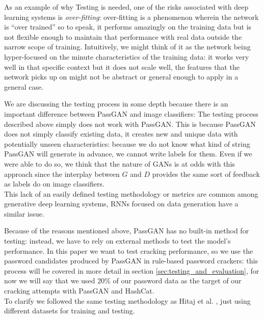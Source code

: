 As an example of why Testing is needed, one of the risks associated with deep learning systems is \emph{over-fitting}: over-fitting is a phenomenon wherein the network is \enquote{over trained} so to speak, it performs amazingly on the training data but is not flexible enough to maintain that performance with real data outside the narrow scope of training. Intuitively, we might think of it as the network being hyper-focused on the minute characteristics of the training data: it works very well in that specific context but it does not scale well, the features that the network picks up on might not be abstract or general enough to apply in a general case. 

We are discussing the testing process in some depth because there is an important difference between PassGAN and image classifiers: The testing process described above simply does not work with PassGAN.
This is because PassGAN does not simply classify existing data, it creates new and unique data with potentially unseen characteristics: because we do  not know what kind of string PassGAN will generate in advance, we cannot write labels for them. Even if we were able to do so, we think that the nature of GANs is at odds with this approach since the interplay between $G$ and $D$ provides the same sort of feedback as labels do on image classifiers.\\

This lack of an easily defined testing methodology or metrics are common among generative deep learning systems, RNNs focused on data generation have a similar issue.

Because of the reasons mentioned above, PassGAN has no built-in method for testing: instead, we have to rely on external methods to test the model's performance.
In this paper we want to test cracking performance, so we use the password candidates produced by PassGAN in rule-based password crackers: this process will be covered in more detail in section \ref{sec:testing_and_evaluation}, for now we will say that we used 20\% of our password data as the target of our cracking attempts with PassGAN and HashCat.\\%
To clarify we followed the same testing methodology as Hitaj et  al. \cite{PassGAN}, just using different datasets for training and testing.


